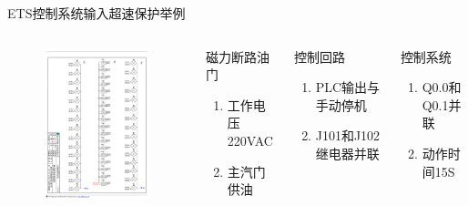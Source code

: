 \documentclass[12pt,hyperref={CJKbookmarks=true}]{beamer} %
\begin{document}
\begin{frame}{ETS控制系统输入}{超速保护举例}
\begin{columns}
\begin{figure}
\includegraphics[angle=0,width=150pt,trim=50 930 0 80,clip]{picture/ets9.pdf}
	
\end{figure}
\begin{block}{磁力断路油门}
			\begin{enumerate}
				\item  工作电压220VAC
				\item  主汽门供油
				\end{enumerate}
\end{block}
\begin{exampleblock}{控制回路}
			\begin{enumerate}
				\item PLC输出与手动停机
				\item J101和J102继电器并联
				\end{enumerate}
\end{exampleblock}
\begin{alertblock}{控制系统}
				\begin{enumerate}
				\item Q0.0和Q0.1并联
				\item 动作时间15S
				\end{enumerate}
\end{alertblock}
		\end{columns}
	\end{frame}
\end{document}
